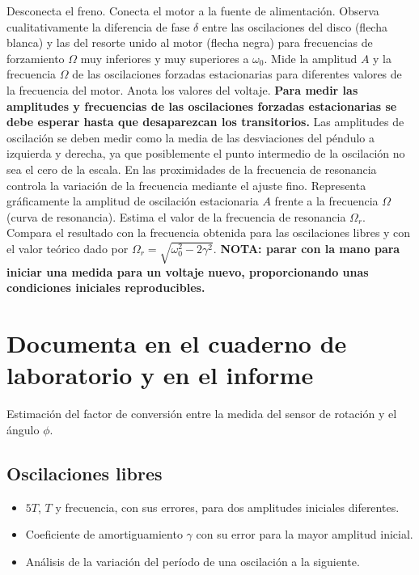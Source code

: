 \documentclass[11pt]{articulo}
\begin{document}
Desconecta el freno. Conecta el motor a la fuente de alimentaci\'on. Observa cualitativamente la diferencia de fase $\delta$ entre las oscilaciones del disco (flecha blanca) y las del resorte unido al motor (flecha negra) para frecuencias de forzamiento $\Omega$ muy inferiores y muy superiores a $\omega_0$. Mide la amplitud $A$ y la frecuencia $\Omega$ de las oscilaciones forzadas estacionarias para diferentes valores de la frecuencia del motor. Anota los valores del voltaje. {\bf Para medir las amplitudes y frecuencias de las oscilaciones forzadas estacionarias se debe esperar hasta que desaparezcan los transitorios.} Las amplitudes de oscilaci\'on se deben medir como la media de las desviaciones del p\'endulo a izquierda y derecha, ya que posiblemente el punto intermedio de la oscilaci\'on no sea el cero de la escala. En las proximidades de la frecuencia de resonancia controla la variaci\'on de la frecuencia mediante el ajuste fino. Representa gr\'aficamente la amplitud de oscilaci\'on estacionaria $A$ frente a la frecuencia $\Omega$ (curva de resonancia). Estima el valor de la frecuencia de resonancia $\Omega_r$. Compara el resultado con la frecuencia obtenida para las oscilaciones libres y con el valor te\'orico dado por $\Omega_r = \sqrt{\omega_0^2 - 2\gamma^2}$. {\bf NOTA: parar con la mano para iniciar una medida para un voltaje nuevo, proporcionando unas condiciones iniciales reproducibles.}


%


\newpage
\section*{Documenta en el cuaderno de laboratorio y en el informe}

Estimaci\'on del factor de conversi\'on entre la medida del sensor de rotaci\'on y el \'angulo $\phi$.

\subsection*{Oscilaciones libres}

\begin{itemize}

\item{$5T$, $T$ y frecuencia, con sus errores, para dos amplitudes iniciales diferentes.}
\item{Coeficiente de amortiguamiento $\gamma$ con su error para la mayor amplitud inicial.}
\item{An\'alisis de la variaci\'on del per\'iodo de una oscilaci\'on a la siguiente.}

\end{itemize}
\end{document}
